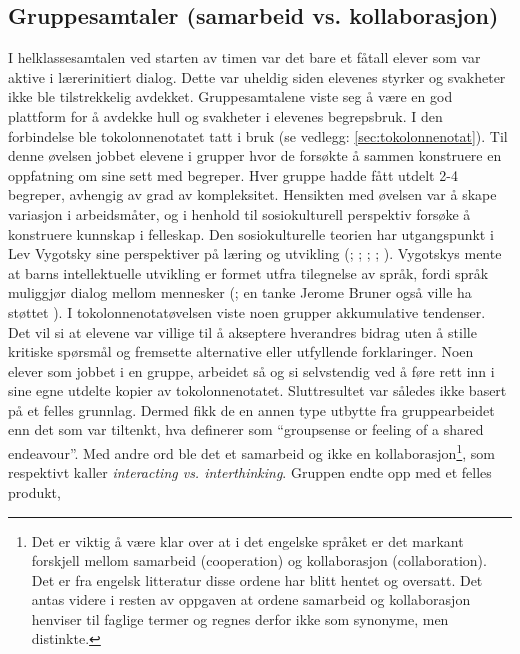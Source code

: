 \documentclass[main.tex]{subfiles}
\begin{document}
\subsection*{Gruppesamtaler (samarbeid vs. kollaborasjon)}
I helklassesamtalen ved starten av timen var det bare et fåtall elever som var aktive i lærerinitiert 
dialog. Dette var uheldig siden elevenes styrker og svakheter ikke ble tilstrekkelig avdekket. 
Gruppesamtalene viste seg å være en god plattform for å avdekke hull og svakheter i elevenes 
begrepsbruk. I den forbindelse ble tokolonnenotatet tatt i bruk (se vedlegg: \ref{sec:tokolonnenotat}).
Til denne øvelsen jobbet elevene i grupper hvor de forsøkte å sammen konstruere en oppfatning om
sine sett med begreper. Hver gruppe hadde fått utdelt 2-4 begreper, avhengig av grad av kompleksitet.
Hensikten med øvelsen var å skape variasjon i arbeidsmåter, og i henhold til sosiokulturell perspektiv
forsøke å konstruere kunnskap i felleskap. Den sosiokulturelle teorien har utgangspunkt i Lev Vygotsky 
sine perspektiver på læring og utvikling (; ; 
; ; ). Vygotskys mente at barns 
intellektuelle utvikling er formet utfra tilegnelse av språk, fordi språk muliggjør dialog mellom 
mennesker (; en tanke Jerome Bruner også ville ha støttet ). 
\newline
\newline
I tokolonnenotatøvelsen viste noen grupper akkumulative tendenser. Det vil si at elevene 
var villige til å akseptere hverandres bidrag uten å stille kritiske spørsmål og fremsette
alternative eller utfyllende forklaringer. Noen elever som jobbet i en gruppe, arbeidet så og si
selvstendig ved å føre rett inn i sine egne utdelte kopier av tokolonnenotatet. Sluttresultet var
således ikke basert på et felles grunnlag. Dermed fikk de en annen type utbytte fra gruppearbeidet
enn det som var tiltenkt, hva   definerer som ``groupsense or feeling of a 
shared endeavour''. Med andre ord ble det et samarbeid og ikke en kollaborasjon\footnote[3]{Det 
er viktig å være klar over at i det engelske språket er det markant forskjell mellom samarbeid 
(cooperation) og kollaborasjon (collaboration). Det er fra engelsk litteratur disse ordene 
har blitt hentet og oversatt. Det antas videre i resten av oppgaven at ordene samarbeid og kollaborasjon 
henviser til faglige termer og regnes derfor ikke som synonyme, men distinkte.}, som  
respektivt kaller \emph{interacting vs. interthinking}. Gruppen endte opp med et felles produkt, 
\end{document}
